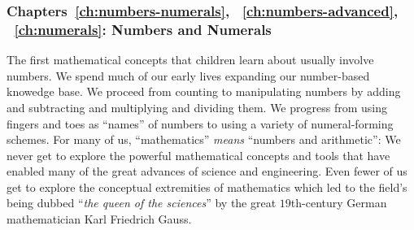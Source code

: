 \subsubsection{Chapters~\ref{ch:numbers-numerals},
~\ref{ch:numbers-advanced}, ~\ref{ch:numerals}: Numbers and Numerals}

The first mathematical concepts that children learn about usually
involve numbers.  We spend much of our early lives expanding our
number-based knowedge base.  We proceed from counting to manipulating
numbers by adding and subtracting and multiplying and dividing them.
We progress from using fingers and toes as ``names'' of numbers to
using a variety of numeral-forming schemes.  For many of us,
``mathematics'' {\em means} ``numbers and arithmetic'': We never get
to explore the powerful mathematical concepts and tools that have
enabled many of the great advances of science and engineering.  Even
fewer of us get to explore the conceptual extremities of mathematics
which led to the field's being dubbed ``{\em the queen of the
  sciences}'' by the great $19$th-century German mathematician Karl
Friedrich Gauss. 

